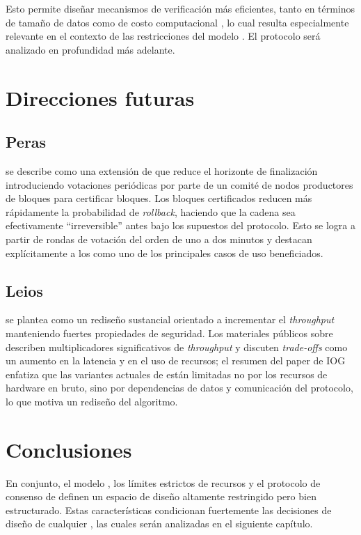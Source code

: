 Esto permite diseñar mecanismos de verificación más eficientes, tanto en términos de tamaño de datos como de costo computacional \Onchain, lo cual resulta especialmente relevante en el contexto de las restricciones del modelo \eUTxO. El protocolo \Mithril será analizado en profundidad más adelante.

\section{Direcciones futuras}

\subsection{Peras}

\Peras se describe como una extensión de \Praos que reduce el horizonte de finalización introduciendo votaciones periódicas por parte de un comité de nodos productores de bloques para certificar bloques. Los bloques certificados reducen más rápidamente la probabilidad de \textit{rollback}, haciendo que la cadena sea efectivamente ``irreversible'' antes bajo los supuestos del protocolo. Esto se logra a partir de rondas de votación del orden de uno a dos minutos y destacan explícitamente a los \Bridges como uno de los principales casos de uso beneficiados.

\subsection{Leios}

\Leios se plantea como un rediseño sustancial orientado a incrementar el \textit{throughput} manteniendo fuertes propiedades de seguridad. Los materiales públicos sobre \Leios describen multiplicadores significativos de \textit{throughput} y discuten \textit{trade-offs} como un aumento en la latencia y en el uso de recursos; el resumen del paper de IOG enfatiza que las variantes actuales de \Ouroboros están limitadas no por los recursos de hardware en bruto, sino por dependencias de datos y comunicación del protocolo, lo que motiva un rediseño del algoritmo.

\section{Conclusiones}

En conjunto, el modelo \eUTxO, los límites estrictos de recursos y el protocolo de consenso de \Cardano definen un espacio de diseño altamente restringido pero bien estructurado. Estas características condicionan fuertemente las decisiones de diseño de cualquier \zkBridge, las cuales serán analizadas en el siguiente capítulo.
